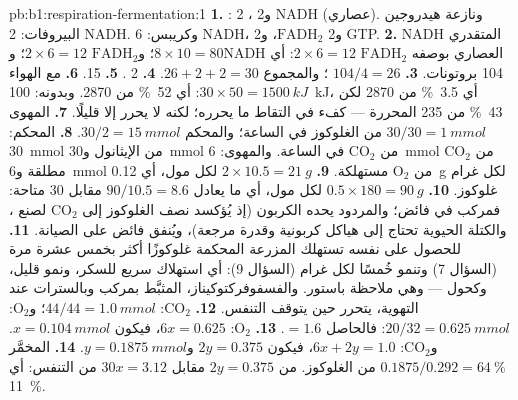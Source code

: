 \begin{solution}{pb:b1:respiration-fermentation:1}
\textbf{1.} : 2 ، و2 NADH (عصاري). ونازعة هيدروجين
البيروفات: 2 NADH. وكريبس: 6 NADH، و2 $\mathrm{FADH_2}$، و2 GTP.
\textbf{2.} NADH المتقدري $8\times 10 = 80$؛ و$\mathrm{FADH_2}$
$2\times 6 = 12$؛ وNADH العصاري بوصفه $\mathrm{FADH_2}$
$2\times 6 = 12$: أي 104 بروتونات.
\textbf{3.} $104/4 = 26$ ؛ والمجموع $26 + 2 + 2 = 30$.
\textbf{4.} 2 .
\textbf{5.} 15.
\textbf{6.} مع الهواء $30\times 50 = \qty{1500}{kJ}$: أي \qty{52}{\%}
من 2870. وبدونه: \qty{100}{kJ}، أي \qty{3.5}{\%} من 2870 لكن
\qty{43}{\%} من 235 المحررة ---  كفء في التقاط ما يحرره؛
لكنه لا يحرر إلا قليلًا.
\textbf{7.} المهوى $30/30 = \qty{1}{mmol}$ من الغلوكوز في الساعة؛
والمحكم $30/2 = \qty{15}{mmol}$.
\textbf{8.} المحكم: \qty{30}{mmol} من الإيثانول و\qty{30}{mmol} من
$\mathrm{CO_2}$ في الساعة. والمهوى: \qty{6}{mmol} من $\mathrm{CO_2}$
مطلقة و\qty{6}{mmol} من $\mathrm{O_2}$ مستهلكة.
\textbf{9.} $2\times 10.5 = \qty{21}{g}$ لكل مول، أي \qty{0.12}{g}
لكل غرام غلوكوز.
\textbf{10.} $0.5\times 180 = \qty{90}{g}$ لكل مول، أي ما يعادل
$90/10.5 =
8.6$  مقابل 30 متاحة: فمركب  في فائض؛ والمردود يحده
الكربون (إذ يُؤكسد نصف الغلوكوز إلى $\mathrm{CO_2}$ لصنع ، والكتلة
الحيوية تحتاج إلى هياكل كربونية وقدرة مرجعة)، ويُنفق فائض  على
الصيانة.
\textbf{11.} للحصول على  نفسه تستهلك المزرعة المحكمة غلوكوزًا أكثر
بخمس عشرة مرة (السؤال 7) وتنمو خُمسًا لكل غرام (السؤال 9): أي استهلاك
سريع للسكر، ونمو قليل، وكحول --- وهي ملاحظة باستور.
والفسفوفركتوكيناز، المثبَّط بمركب  وبالسترات عند التهوية، يتحرر حين
يتوقف التنفس.
\textbf{12.} $\mathrm{CO_2}$: $44/44 = \qty{1.0}{mmol}$؛
و$\mathrm{O_2}$: $20/32 = \qty{0.625}{mmol}$: فالحاصل $= 1.6$.
\textbf{13.} $\mathrm{O_2}$: $6x = 0.625$، فيكون
$x = \qty{0.104}{mmol}$. و$\mathrm{CO_2}$: $6x + 2y = 1.0$، فيكون
$2y = 0.375$ و$y = \qty{0.1875}{mmol}$.
\textbf{14.} المخمَّر $0.1875/0.292 = \qty{64}{\%}$ من الغلوكوز. 
من  $2y = 0.375$ مقابل $30x = 3.12$ من التنفس: أي \qty{11}{\%}.

\end{solution}
